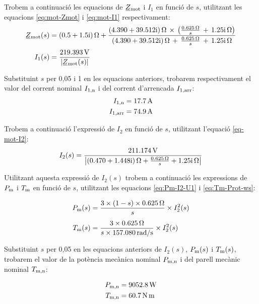 \begin{exemple}
 Trobem a continuació les equacions de $\cmplx{Z}\ped{mot}$ i $I_1$ en funció de $s$, utilitzant les equacions \eqref{eq:mot-Zmot} i \eqref{eq:mot-I1} respectivament:
    \begin{align*}
		\cmplx{Z}\ped{mot}(s) &= \complexqty{0,5+j1,5}{\ohm} + \frac{\complexqty{4,390+j39,512}{\ohm}\,\times\,
	      \left(\tfrac{\qty{0,625}{\ohm}}{s}\, + \, \complexqty{j1,25}{\ohm}\right)}{\complexqty{4,390+j39,512}{\ohm}\,+\,
	   \tfrac{\qty{0,625}{\ohm}}{s}\, + \,\complexqty{j1,25}{\ohm}} \\[0.5ex]
   		I_1(s)  &= \frac{\qty{219,393}{V}}{|\cmplx{Z}\ped{mot}(s)|}  
	\end{align*} 
 
    Substituint $s$ per 0,05 i 1 en les equacions anteriors, trobarem respectivament el valor del corrent nominal $I_\mathrm{1,n}$ i del corrent d'arrencada $I_\mathrm{1,arr}$:
    \begin{align*}
        I_\mathrm{1,n} &= \qty{17,7}{A} \\
        I_\mathrm{1,arr} &= \qty{74,9}{A}
    \end{align*}
    
    Trobem a continuació l'expressió de $I_2$ en funció de $s$, utilitzant l'equació \eqref{eq-mot-I2}:
    \[
        I_2(s) = \frac{\qty{211,174}{V}}{\left| \complexqty{0,470+j1,448}{\ohm} + \frac{\qty{0,625}{\ohm}}{s} + \complexqty{j1,25}{\ohm} \right|}
    \]

    Utilitzant aquesta expressió de $I_2(s)$ trobem a continuació les expressions de $P_\mathrm{m}$ i $T_\mathrm{m}$ en funció de $s$, utilitzant les equacions \eqref{eq:Pm-I2-U1} i \eqref{eq:Tm-Prot-ws}:
    
     \begin{align*}
        P_\mathrm{m}(s) &=\frac{ 3\times (1-s)\times \qty{0,625}{\ohm} }{s} \times  I_2^2(s) \\[1ex]
        T_\mathrm{m}(s)  &=  \frac{3\times \qty{0,625}{\ohm}}{s\times \qty{157,080}{rad/s}} \times  I_2^2(s)
    \end{align*}

     Substituint $s$ per 0,05  en les equacions anteriors de $I_2(s)$, $P_\mathrm{m}(s)$ i $T_\mathrm{m}(s)$, trobarem el valor de la potència mecànica nominal $P_\mathrm{m,n}$ i del parell mecànic nominal $T_\mathrm{m,n}$:
     
     \begin{align*}
        P_\mathrm{m,n} &= \qty{9052,8}{W} \\
         T_\mathrm{m,n} &= \qty{60,7}{N.m} 
    \end{align*}   
    

\end{exemple}
